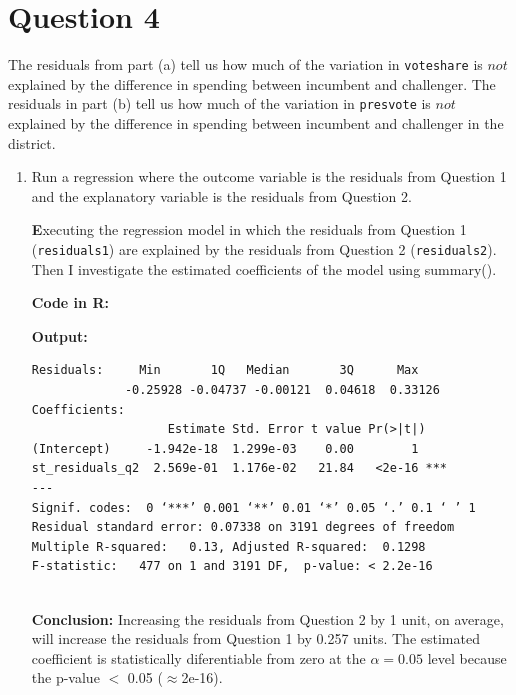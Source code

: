 \documentclass[12pt,letterpaper]{article}
\begin{document}
\section*{Question 4}
\noindent The residuals from part (a) tell us how much of the variation in \texttt{voteshare} is $not$ explained by the difference in spending between incumbent and challenger. The residuals in part (b) tell us how much of the variation in \texttt{presvote} is $not$ explained by the difference in spending between incumbent and challenger in the district.
	\begin{enumerate}
		\item Run a regression where the outcome variable is the residuals from Question 1 and the explanatory variable is the residuals from Question 2.	\vspace{0.5cm}
		
			\noindent \textbf Executing the regression model in which the residuals from Question 1 (\texttt{residuals1}) are explained by the residuals from Question 2 (\texttt{residuals2}). Then I investigate the estimated coefficients of the model using summary(). \vspace{0.5cm}
		
		\noindent \textbf{Code in R:}
		  
		\vspace{.25cm}
		
		\noindent \textbf{Output: }
				\begin{footnotesize}
		\begin{verbatim}
Residuals:     Min       1Q   Median       3Q      Max 
             -0.25928 -0.04737 -0.00121  0.04618  0.33126 
Coefficients:                  
                   Estimate Std. Error t value Pr(>|t|)    
(Intercept)     -1.942e-18  1.299e-03    0.00        1    
st_residuals_q2  2.569e-01  1.176e-02   21.84   <2e-16 ***
---
Signif. codes:  0 ‘***’ 0.001 ‘**’ 0.01 ‘*’ 0.05 ‘.’ 0.1 ‘ ’ 1
Residual standard error: 0.07338 on 3191 degrees of freedom
Multiple R-squared:   0.13,	Adjusted R-squared:  0.1298 
F-statistic:   477 on 1 and 3191 DF,  p-value: < 2.2e-16	
			
		\end{verbatim}  
			\end{footnotesize}
		\vspace{.25cm}
		
		\noindent \textbf{Conclusion:} Increasing the residuals from Question 2 by 1 unit, on average, will increase the residuals from Question 1 by 0.257 units. The estimated coefficient is statistically diferentiable from zero at the  $\alpha=0.05$ level because the p-value $<$ 0.05 ($\approx $2e-16).
		\vspace{1 cm}
		

\end{enumerate}
\end{document}
